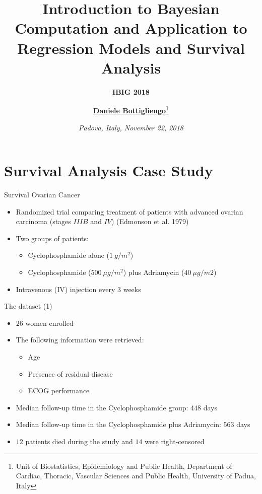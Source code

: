 \documentclass[ignorenonframetext,a4paper]{beamer}
\title{\Large\textbf{Introduction to Bayesian Computation and Application to Regression Models and Survival Analysis}}
\subtitle{\large\textbf{\textrm{IBIG 2018}}}
\author{\centering\underline{\textbf{Daniele Bottigliengo}}\thanks{\tiny Unit of Biostatistics, Epidemiology and Public Health, Department of \newline Cardiac, Thoracic, Vascular Sciences and Public Health, University of Padua, Italy}}
\date{\centering\emph{Padova, Italy, November 22, 2018}}
\begin{document}
\frame{\titlepage}

\section{Survival Analysis Case
Study}\label{survival-analysis-case-study}

\begin{frame}{Survival Ovarian Cancer}

\begin{itemize}
\item
  Randomized trial comparing treatment of patients with advanced ovarian
  carcinoma (stages \(IIIB\) and \(IV\)) (Edmonson et al. 1979)
\item
  Two groups of patients:

  \begin{itemize}
  \item{Cyclophosphamide alone ($1 \> g/m^{2}$)}
  \item{Cyclophosphamide ($500 \> \mu g/m^{2}$) plus Adriamycin 
      ($40 \> \mu g/m2$)}
    \end{itemize}
\item
  Intravenous (IV) injection every \(3\) weeks
\end{itemize}

\end{frame}

\begin{frame}{The dataset (1)}

\begin{itemize}
\setlength\itemsep{1em}
  \item{$26$ women enrolled}
  \item{The following information were retrieved:}
  \begin{itemize}
    \item{Age}
    \item{Presence of residual disease}
    \item{ECOG performance}
  \end{itemize}
\item{Median follow-up time in the Cyclophosphamide group: 
      $448$ days}
\item{Median follow-up time in the Cyclophosphamide plus 
      Adriamycin: $563$ days}  
\item{$12$ patients died during the study and $14$ were right-censored}
\end{itemize}

\end{frame}
\end{document}
